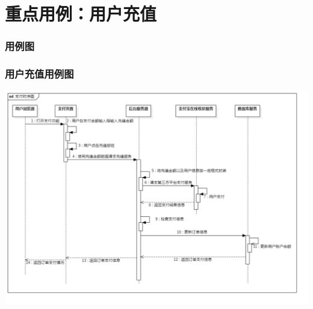 \section{重点用例：用户充值}
\begin{frame}
    \frametitle{用例图}
    \frametitle{用户充值用例图}
    \center
    \includegraphics[scale=0.25]{contents/figure/pay_sequence_diagram.png}
\end{frame}